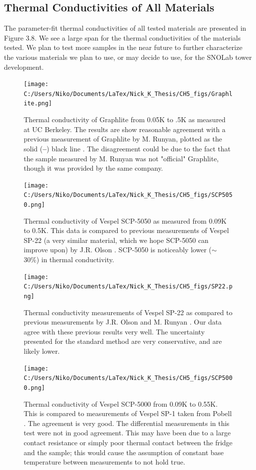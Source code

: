 \documentclass{report}
\begin{document}
\subsection{Thermal Conductivities of All Materials}
The parameter-fit thermal conductivities of all tested materials are presented in Figure 3.8. We see a large span for the thermal conductivities of the materials tested. We plan to test more samples in the near future to further characterize the various materials we plan to use, or may decide to use, for the SNOLab tower development.

\begin{figure}[h]
\centering
\texttt{[image: C:/Users/Niko/Documents/LaTex/Nick\_K\_Thesis/CH5\_figs/Graphlite.png]}
\caption{Thermal conductivity of Graphlite from 0.05K to .5K as measured at UC Berkeley. The results are show reasonable agreement with a previous measurement of Graphlite by M. Runyan, plotted as the solid (\textbf{--}) black line \cite{run}. The disagreement could be due to the fact that the sample measured by M. Runyan was not "official" Graphlite, though it was provided by the same company.}
\end{figure}

\begin{figure}[h]
\centering
\texttt{[image: C:/Users/Niko/Documents/LaTex/Nick\_K\_Thesis/CH5\_figs/SCP5050.png]}
\caption{Thermal conductivity of Vespel SCP-5050 as measured from 0.09K to 0.5K. This data is compared to previous measurements of Vespel SP-22 (a very similar material, which we hope SCP-5050 can improve upon) by J.R. Olson \cite{ols}. SCP-5050 is noticeably lower ($\sim$ 30\%) in thermal conductivity.}
\end{figure}

\begin{figure}[h]
\centering
\texttt{[image: C:/Users/Niko/Documents/LaTex/Nick\_K\_Thesis/CH5\_figs/SP22.png]}
\caption{Thermal conductivity measurements of Vespel SP-22 as compared to previous measurements by J.R. Olson \cite{ols} and M. Runyan \cite{run}. Our data agree with these previous results very well. The uncertainty presented for the standard method are very conservative, and are likely lower. }
\end{figure}

\begin{figure}[h]
\centering
\texttt{[image: C:/Users/Niko/Documents/LaTex/Nick\_K\_Thesis/CH5\_figs/SCP5000.png]}
\caption{Thermal conductivity of Vespel SCP-5000 from 0.09K to 0.55K. This is compared to measurements of Vespel SP-1 taken from Pobell \cite{pob}. The agreement is very good. The differential measurements in this test were not in good agreement. This may have been due to a large contact resistance or simply poor thermal contact between the fridge and the sample; this would cause the assumption of constant base temperature between measurements to not hold true.}
\end{figure}
\end{document}
